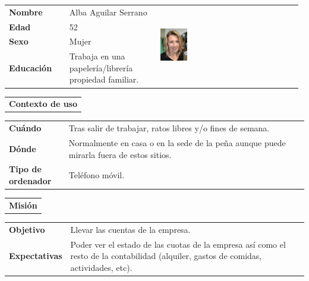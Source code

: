 \documentclass[11pt]{article}
\begin{document}
\begin{table}[H]
	\centering
	\begin{tabular}{p{0.2\linewidth}|p{0.3\linewidth}p{0.475\linewidth}}
		\toprule
		\textbf{Nombre} & Alba Aguilar Serrano &\multirow{4}{*}{\begin{minipage}{1.\textwidth}\includegraphics[width=0.2\textwidth, height=30mm]{Alba}\end{minipage}}\\
		\textbf{Edad} & 52 & \\
		\textbf{Sexo} & Mujer & \\
		\textbf{Educación} & Trabaja en una papelería/librería propiedad familiar.  & \\
		\bottomrule
	\end{tabular}
	
	\begin{tabular}{l}
		\textbf{Contexto de uso} 
	\end{tabular}
	
	\begin{tabular}{p{0.2\linewidth}|p{0.8\linewidth}}
		\toprule
		\textbf{Cuándo} & Tras salir de trabajar, ratos libres y/o fines de semana.\\
		\textbf{Dónde}  & Normalmente en casa o en la sede de la peña aunque puede mirarla fuera de estos sitios.\\
		\textbf{Tipo de ordenador} & Teléfono móvil.\\
		\bottomrule
	\end{tabular}
	
	\begin{tabular}{l}
		\textbf{Misión} 
	\end{tabular}
	
	\begin{tabular}{p{0.2\linewidth}|p{0.8\linewidth}}
		\toprule
		\textbf{Objetivo} & Llevar las cuentas de la empresa.
		\\
		\textbf{Expectativas}  & Poder ver el estado de las cuotas de la empresa así como el resto de la contabilidad (alquiler, gastos de comidas, actividades, etc). \\
		\bottomrule
	\end{tabular}
	

\end{table}
\end{document}
